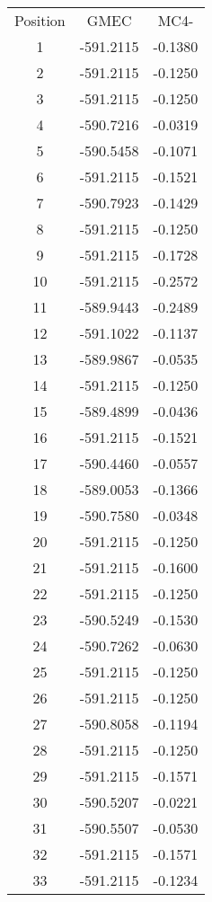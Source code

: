 \begin{table}[h]
\begin{tabular}{ccc}
        \toprule
        Position & GMEC & MC4- \\
        \cmidrule{1-3}
        1 & -591.2115 & -0.1380 \\
        2 & -591.2115 & -0.1250 \\
        3 & -591.2115 & -0.1250 \\
        4 & -590.7216 & -0.0319 \\
        5 & -590.5458 & -0.1071 \\
        6 & -591.2115 & -0.1521 \\
        7 & -590.7923 & -0.1429 \\
        8 & -591.2115 & -0.1250 \\
        9 & -591.2115 & -0.1728 \\
        10 & -591.2115 & -0.2572 \\
        11 & -589.9443 & -0.2489 \\
        12 & -591.1022 & -0.1137 \\
        13 & -589.9867 & -0.0535 \\
        14 & -591.2115 & -0.1250 \\
        15 & -589.4899 & -0.0436 \\
        16 & -591.2115 & -0.1521 \\
        17 & -590.4460 & -0.0557 \\
        18 & -589.0053 & -0.1366 \\
        19 & -590.7580 & -0.0348 \\
        20 & -591.2115 & -0.1250 \\
        21 & -591.2115 & -0.1600 \\
        22 & -591.2115 & -0.1250 \\
        23 & -590.5249 & -0.1530 \\
        24 & -590.7262 & -0.0630 \\
        25 & -591.2115 & -0.1250 \\
        26 & -591.2115 & -0.1250 \\
        27 & -590.8058 & -0.1194 \\
        28 & -591.2115 & -0.1250 \\
        29 & -591.2115 & -0.1571 \\
        30 & -590.5207 & -0.0221 \\
        31 & -590.5507 & -0.0530 \\
        32 & -591.2115 & -0.1571 \\
        33 & -591.2115 & -0.1234 \\

\end{tabular}
\end{table}
